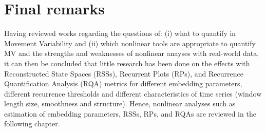 \section{Final remarks}
Having reviewed works regarding the questions of: (i) what to quantify in 
Movement Variability and (ii) which nonlinear tools are appropriate to quantify 
MV and the strengths and weaknesses of nonlinear anayses with 
real-world data, it can then be concluded that little research has been done 
on the effects with Reconstructed State Spaces (RSSs), Recurrent Plots (RPs), 
and Recurrence Quantification Analysis (RQA) metrics for different 
embedding parameters, different recurrence thresholds and different 
characteristics of time series (window length size, smoothness and structure).
Hence, nonlinear analyses such as estimation of embedding parameters, 
RSSs, RPs, and RQAs are reviewed in the following chapter.





